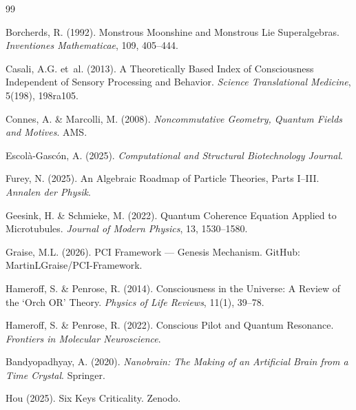 \documentclass[12pt,a4paper]{article}
\begin{document}
\begin{thebibliography}{99}

Borcherds, R. (1992).
\newblock Monstrous Moonshine and Monstrous Lie Superalgebras.
\newblock \textit{Inventiones Mathematicae}, 109, 405--444.

Casali, A.G. et~al. (2013).
\newblock A Theoretically Based Index of Consciousness Independent of Sensory Processing and Behavior.
\newblock \textit{Science Translational Medicine}, 5(198), 198ra105.

Connes, A. \& Marcolli, M. (2008).
\newblock \textit{Noncommutative Geometry, Quantum Fields and Motives}.
\newblock AMS.

Escol\`a-Gasc\'on, A. (2025).
\newblock \textit{Computational and Structural Biotechnology Journal}.

Furey, N. (2025).
\newblock An Algebraic Roadmap of Particle Theories, Parts I--III.
\newblock \textit{Annalen der Physik}.

Geesink, H. \& Schmieke, M. (2022).
\newblock Quantum Coherence Equation Applied to Microtubules.
\newblock \textit{Journal of Modern Physics}, 13, 1530--1580.

Graise, M.L. (2026).
\newblock PCI Framework --- Genesis Mechanism.
\newblock GitHub: MartinLGraise/PCI-Framework.

Hameroff, S. \& Penrose, R. (2014).
\newblock Consciousness in the Universe: A Review of the `Orch OR' Theory.
\newblock \textit{Physics of Life Reviews}, 11(1), 39--78.

Hameroff, S. \& Penrose, R. (2022).
\newblock Conscious Pilot and Quantum Resonance.
\newblock \textit{Frontiers in Molecular Neuroscience}.

Bandyopadhyay, A. (2020).
\newblock \textit{Nanobrain: The Making of an Artificial Brain from a Time Crystal}.
\newblock Springer.

Hou (2025).
\newblock Six Keys Criticality.
\newblock Zenodo.


\end{thebibliography}
\end{document}
